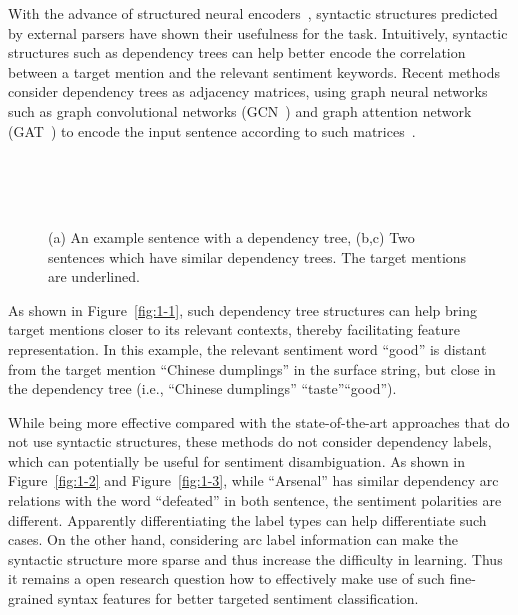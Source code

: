 \documentclass[journal]{IEEEtran}
\begin{document}
	With the advance of structured neural encoders~\cite{dong-etal-2014-adaptive,tai-etal-2015-improved,kipf2017semi,velickovic2018gat}, syntactic structures predicted by external parsers have shown their usefulness for the task.
	Intuitively, syntactic structures such as dependency trees can help better encode the correlation between a target mention and the relevant sentiment keywords.
	Recent methods consider dependency trees as adjacency matrices, using graph neural networks such as graph convolutional networks (GCN~\cite{kipf2017semi}) and graph attention network (GAT~\cite{velickovic2018gat}) to encode the input sentence according to such matrices~\cite{sun-etal-2019-aspect,huang-carley-2019-syntax,zhang-etal-2019-aspect}. 
	\begin{figure}[t!]
		\centering 
		\\ \hspace{-1pt}        
		 \\
		 \\ 
		\caption{(a) An example sentence with a dependency tree, (b,c) Two sentences which have similar dependency trees. The target mentions are underlined.}
		\label{fig:example}
	\end{figure}
	As shown in Figure~\ref{fig:1-1}, such dependency tree structures can help bring target mentions closer to its relevant contexts, thereby facilitating feature representation. 
	In this example, the relevant sentiment word ``good'' is distant from the target mention ``Chinese dumplings'' in the surface string, but close in the dependency tree (i.e., ``Chinese dumplings''
	``taste''``good'').
	
	While being more effective compared with the state-of-the-art approaches that do not use syntactic structures, these methods do not consider dependency labels, which can potentially be useful for sentiment disambiguation. 
	As shown in Figure~\ref{fig:1-2} and Figure~\ref{fig:1-3}, while ``Arsenal'' has similar dependency arc relations with the word ``defeated'' in both sentence, the sentiment polarities  are different.
Apparently differentiating the label types can help differentiate such cases.
	On the other hand, considering arc label information can make the syntactic structure more sparse and thus increase the difficulty in learning. 
	Thus it remains a open research question how to effectively make use of such fine-grained syntax features for better targeted sentiment classification.
	
\end{document}
